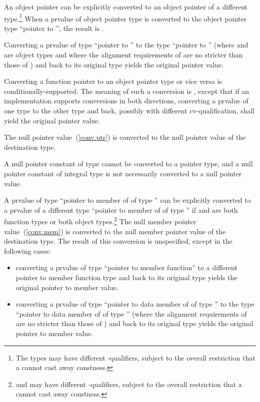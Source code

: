 \pnum
An object pointer
can be explicitly converted to an object pointer of a different type.\footnote{The
types may have different \cv-qualifiers, subject to
the overall
restriction that a  cannot cast away constness.}
When a prvalue  of object pointer type is converted to
the object pointer type ``pointer to \cv{} '', the result is .
\begin{note}
Converting a prvalue of type ``pointer to '' to
the type ``pointer to '' (where  and  are
object types and where the alignment requirements of  are no
stricter than those of ) and back to its original type yields
the original pointer value.
\end{note}

\pnum
Converting a function pointer to an object pointer
type or vice versa is
conditionally-supported. The meaning of such a conversion is
,
except that if an implementation
supports conversions in both directions, converting a prvalue of one type to the other
type and back, possibly with different cv-qualification, shall yield the original
pointer value.

\pnum
The null pointer value~(\ref{conv.ptr}) is converted to the null pointer value
of the destination type.
\begin{note}
A null pointer constant of type  cannot be converted to a
pointer type, and a null pointer constant of integral type is not necessarily
converted to a null pointer value.
\end{note}

\pnum
{}%
%
A prvalue of type ``pointer to member of  of type ''
can be explicitly converted to a prvalue of a different type ``pointer to member of
 of type '' if  and  are both
function types or both object types.\footnote{ and  may have
different \cv-qualifiers, subject to
the overall restriction that a  cannot cast away
constness.} The null member pointer value~(\ref{conv.mem}) is converted to the
null member pointer value of the destination type. The result of this
conversion is unspecified, except in the following cases:

\begin{itemize}
\item converting a prvalue of type ``pointer to member function'' to a
different pointer to member function type and back to its original type
yields the original pointer to member value.

\item converting a prvalue of type ``pointer to data member of 
of type '' to the type ``pointer to data member of 
of type '' (where the alignment requirements of  are
no stricter than those of ) and back to its original type
yields the original pointer to member value.
\end{itemize}

